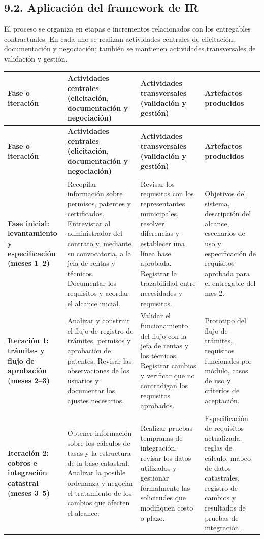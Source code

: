 \documentclass[10pt,letterpaper]{article}
\newcommand{\subtitulo}[1]{\subsection*{\textcolor{azul}{#1}}}
\begin{document}
\par
\normalsize
\par
\subtitulo{9.2. Aplicación del framework de IR}
\par
El proceso se organiza en etapas e incrementos relacionados con los entregables contractuales. En cada uno se realizan actividades centrales de elicitación, documentación y negociación; también se mantienen actividades transversales de validación y gestión.
\par
\scriptsize
\par
\begin{longtable}{@{}p{3.15cm}p{7.15cm}p{7.15cm}p{7.15cm}@{}}
\rowcolor{verde}\color{white}\textbf{Fase o iteración}&\color{white}\textbf{Actividades centrales (elicitación, documentación y negociación)}&\color{white}\textbf{Actividades transversales (validación y gestión)}&\color{white}\textbf{Artefactos producidos}\\\endfirsthead
\rowcolor{verde}\color{white}\textbf{Fase o iteración}&\color{white}\textbf{Actividades centrales (elicitación, documentación y negociación)}&\color{white}\textbf{Actividades transversales (validación y gestión)}&\color{white}\textbf{Artefactos producidos}\\\endhead
\textbf{Fase inicial: levantamiento y especificación (meses 1--2)}&Recopilar información sobre permisos, patentes y certificados. Entrevistar al administrador del contrato y, mediante su convocatoria, a la jefa de rentas y técnicos. Documentar los requisitos y acordar el alcance inicial.&Revisar los requisitos con los representantes municipales, resolver diferencias y establecer una línea base aprobada. Registrar la trazabilidad entre necesidades y requisitos.&Objetivos del sistema, descripción del alcance, escenarios de uso y especificación de requisitos aprobada para el entregable del mes 2.\\\hline
\textbf{Iteración 1: trámites y flujo de aprobación (meses 2--3)}&Analizar y construir el flujo de registro de trámites, permisos y aprobación de patentes. Revisar las observaciones de los usuarios y documentar los ajustes necesarios.&Validar el funcionamiento del flujo con la jefa de rentas y los técnicos. Registrar cambios y verificar que no contradigan los requisitos aprobados.&Prototipo del flujo de trámites, requisitos funcionales por módulo, casos de uso y criterios de aceptación.\\\hline
\textbf{Iteración 2: cobros e integración catastral (meses 3--5)}&Obtener información sobre los cálculos de tasas y la estructura de la base catastral. Analizar la posible ordenanza y negociar el tratamiento de los cambios que afecten el alcance.&Realizar pruebas tempranas de integración, revisar los datos utilizados y gestionar formalmente las solicitudes que modifiquen costo o plazo.&Especificación de requisitos actualizada, reglas de cálculo, mapeo de datos catastrales, registro de cambios y resultados de pruebas de integración.\\\hline

\end{longtable}
\end{document}
